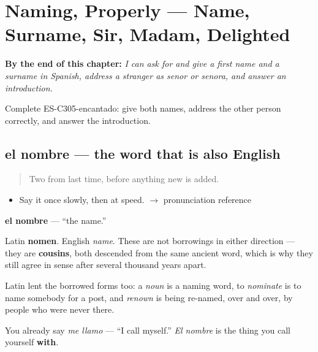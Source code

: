 
\chapter{Naming, Properly --- Name, Surname, Sir, Madam, Delighted}
\label{ch:nombre-y-apellido}

\begin{chapteropening}
\textbf{By the end of this chapter:} \emph{I can ask for and give a first name and a surname in Spanish, address a stranger as senor or senora, and answer an introduction.}

Complete ES-C305-encantado: give both names, address the other person correctly, and answer the introduction.
\end{chapteropening}

\section[el nombre]{el nombre — the word that is also English}

\label{lesson:ES-C305-nombre}



\begin{quote}
Two from last time, before anything new is added.
\end{quote}

\begin{sounds}
\begin{itemize}
\raggedright
  \item Say it once slowly, then at speed. $\to$ pronunciation reference
\end{itemize}
\end{sounds}

\begin{cousinweb}
\textbf{el nombre} — \textquotedblleft{}the name.\textquotedblright{}

Latin \textbf{nomen}. English \emph{name}. These are not borrowings in either direction — they are \textbf{cousins}, both descended from the same ancient word, which is why they still agree in sense after several thousand years apart.

Latin lent the borrowed forms too: a \emph{noun} is a naming word, to \emph{nominate} is to name somebody for a post, and \emph{renown} is being re-named, over and over, by people who were never there.

You already say \emph{me llamo} — \textquotedblleft{}I call myself.\textquotedblright{} \emph{El nombre} is the thing you call yourself \textbf{with}.
\end{cousinweb}

